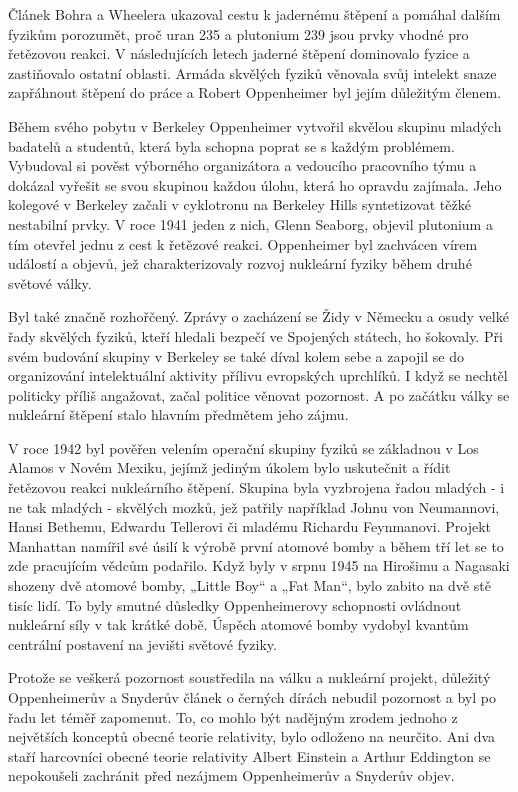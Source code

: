   Článek Bohra a Wheelera ukazoval cestu k jadernému štěpení a pomáhal dalším fyzikům porozumět,
  proč uran 235 a plutonium 239 jsou prvky vhodné pro řetězovou reakci. V následujících letech
  jaderné štěpení dominovalo fyzice a zastiňovalo ostatní oblasti. Armáda skvělých fyziků věnovala
  svůj intelekt snaze zapřáhnout štěpení do práce a Robert Oppenheimer byl jejím důležitým členem.
  
  Během svého pobytu v Berkeley Oppenheimer vytvořil skvělou skupinu mladých badatelů a studentů,
  která byla schopna poprat se s každým problémem. Vybudoval si pověst výborného organizátora a
  vedoucího pracovního týmu a dokázal vyřešit se svou skupinou každou úlohu, která ho opravdu
  zajímala. Jeho kolegové v Berkeley začali v cyklotronu na Berkeley Hills syntetizovat těžké
  nestabilní prvky. V roce 1941 jeden z nich, Glenn Seaborg, objevil plutonium a tím otevřel jednu z
  cest k řetězové reakci. Oppenheimer byl zachvácen vírem událostí a objevů, jež charakterizovaly
  rozvoj nukleární fyziky během druhé světové války. 
  
  Byl také značně rozhořčený. Zprávy o zacházení se Židy v Německu a osudy velké řady skvělých
  fyziků, kteří hledali bezpečí ve Spojených státech, ho šokovaly. Při svém budování skupiny v
  Berkeley se také díval kolem sebe a zapojil se do organizování intelektuální aktivity přílivu
  evropských uprchlíků. I když se nechtěl politicky příliš angažovat, začal politice věnovat
  pozornost. A po začátku války se nukleární štěpení stalo hlavním předmětem jeho zájmu. 
  
  V roce 1942 byl pověřen velením operační skupiny fyziků se základnou v Los Alamos v Novém Mexiku,
  jejímž jediným úkolem bylo uskutečnit a řídit řetězovou reakci nukleárního štěpení. Skupina byla
  vyzbrojena řadou mladých - i ne tak mladých - skvělých mozků, jež patřily například Johnu von
  Neumannovi, Hansi Bethemu, Edwardu Tellerovi či mladému Richardu Feynmanovi. Projekt Manhattan
  namířil své úsilí k výrobě první atomové bomby a během tří let se to zde pracujícím vědcům
  podařilo. Když byly v srpnu 1945 na Hirošimu a Nagasaki shozeny dvě atomové bomby, „Little Boy“ a
  „Fat Man“, bylo zabito na dvě stě tisíc lidí. To byly smutné důsledky Oppenheimerovy schopnosti
  ovládnout nukleární síly v tak krátké době. Úspěch atomové bomby vydobyl kvantům centrální
  postavení na jevišti světové fyziky.
  
  Protože se veškerá pozornost soustředila na válku a nukleární projekt, důležitý Oppenheimerův a
  Snyderův článek o černých dírách nebudil pozornost a byl po řadu let téměř zapomenut. To, co mohlo
  být nadějným zrodem jednoho z největších konceptů obecné teorie relativity, bylo odloženo na
  neurčito. Ani dva staří harcovníci obecné teorie relativity Albert Einstein a Arthur Eddington se
  nepokoušeli zachránit před nezájmem Oppenheimerův a Snyderův objev. 
  
